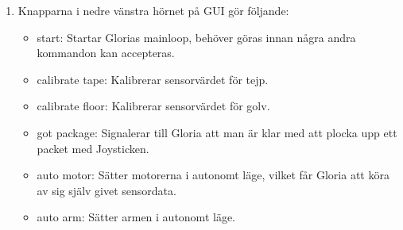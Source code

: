 \begin{enumerate}
\begin{itemize}
	\end{itemize}
	\item Knapparna i nedre vänstra hörnet på GUI gör följande:
	\begin{itemize}
		\item start: Startar Glorias mainloop, behöver göras innan några andra kommandon kan accepteras.
		\item calibrate tape: Kalibrerar sensorvärdet för tejp.
		\item calibrate floor: Kalibrerar sensorvärdet för golv.
		\item got package: Signalerar till Gloria att man är klar med att plocka upp ett packet med Joysticken.
		\item auto motor: Sätter motorerna i autonomt läge, vilket får Gloria att köra av sig själv givet sensordata.
		\item auto arm: Sätter armen i autonomt läge.
	\end{itemize}
\end{enumerate}